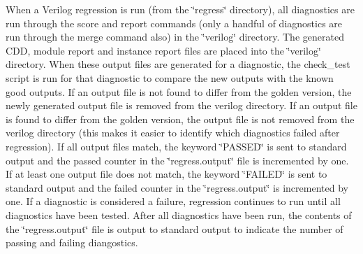 \begin{Desc}
\item[]When a Verilog regression is run (from the \char`\"{}regress\char`\"{} directory), all diagnostics are run through the score and report commands (only a handful of diagnostics are run through the merge command also) in the \char`\"{}verilog\char`\"{} directory. The generated CDD, module report and instance report files are placed into the \char`\"{}verilog\char`\"{} directory. When these output files are generated for a diagnostic, the check\_\-test script is run for that diagnostic to compare the new outputs with the known good outputs. If an output file is not found to differ from the golden version, the newly generated output file is removed from the verilog directory. If an output file is found to differ from the golden version, the output file is not removed from the verilog directory (this makes it easier to identify which diagnostics failed after regression). If all output files match, the keyword \char`\"{}PASSED\char`\"{} is sent to standard output and the passed counter in the \char`\"{}regress.output\char`\"{} file is incremented by one. If at least one output file does not match, the keyword \char`\"{}FAILED\char`\"{} is sent to standard output and the failed counter in the \char`\"{}regress.output\char`\"{} is incremented by one. If a diagnostic is considered a failure, regression continues to run until all diagnostics have been tested. After all diagnostics have been run, the contents of the \char`\"{}regress.output\char`\"{} file is output to standard output to indicate the number of passing and failing diangostics.\end{Desc}




